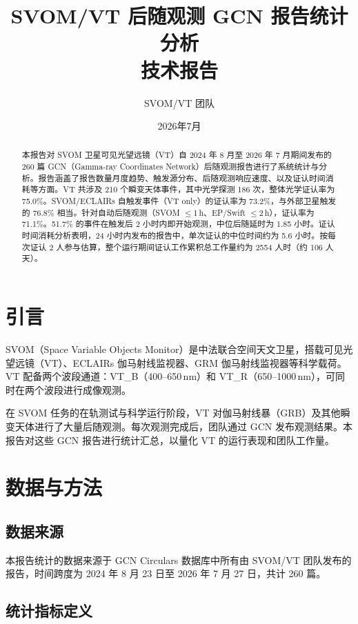 \documentclass[11pt,a4paper]{article}
\title{\textbf{SVOM/VT 后随观测 GCN 报告统计分析}\\[6pt]
\large 技术报告}
\author{SVOM/VT 团队}
\date{2026年7月}
\begin{document}
\maketitle

\begin{abstract}
本报告对 SVOM 卫星可见光望远镜（VT）自 2024 年 8 月至 2026 年 7 月期间发布的 260 篇 GCN（Gamma-ray Coordinates Network）后随观测报告进行了系统统计与分析。报告涵盖了报告数量月度趋势、触发源分布、后随观测响应速度、以及证认时间消耗等方面。VT 共涉及 210 个瞬变天体事件，其中光学探测 186 次，整体光学证认率为 75.0\%。SVOM/ECLAIRs 自触发事件（VT only）的证认率为 73.2\%，与外部卫星触发的 76.8\% 相当。针对自动后随观测（SVOM $\leq$1\,h、EP/Swift $\leq$2\,h），证认率为 71.1\%。51.7\% 的事件在触发后 2 小时内即开始观测，中位后随延时为 1.85 小时。证认时间消耗分析表明，24 小时内发布的报告中，单次证认的中位时间约为 5.6 小时。按每次证认 2 人参与估算，整个运行期间证认工作累积总工作量约为 2554 人时（约 106 人天）。
\end{abstract}

\section{引言}

SVOM（Space Variable Objects Monitor）是中法联合空间天文卫星，搭载可见光望远镜（VT）、ECLAIRs 伽马射线监视器、GRM 伽马射线监视器等科学载荷。VT 配备两个波段通道：VT\_B（400--650\,nm）和 VT\_R（650--1000\,nm），可同时在两个波段进行成像观测。

在 SVOM 任务的在轨测试与科学运行阶段，VT 对伽马射线暴（GRB）及其他瞬变天体进行了大量后随观测。每次观测完成后，团队通过 GCN 发布观测结果。本报告对这些 GCN 报告进行统计汇总，以量化 VT 的运行表现和团队工作量。

\section{数据与方法}

\subsection{数据来源}

本报告统计的数据来源于 GCN Circulars 数据库中所有由 SVOM/VT 团队发布的报告，时间跨度为 2024 年 8 月 23 日至 2026 年 7 月 27 日，共计 260 篇。

\subsection{统计指标定义}
\end{document}
